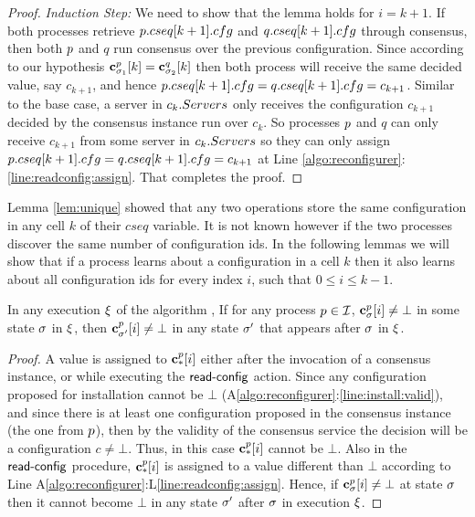 \begin{proof}
	\emph{Induction Step:}  We need to show that the lemma holds for $i=k+1$.
	If both processes retrieve $p.cseq[k+1].cfg$ and $q.cseq[k+1].cfg$ through consensus, 
	then both $p$ and $q$ run consensus
	over the previous configuration. Since according to our hypothesis 
	$\mathbf{c}^{p}_{\sigma_1}[k]=\mathbf{c}^{q}_{\sigma_2}[k]$ then both process will receive the same
	decided value, say $c_{k+1}$, and hence $p.cseq[k+1].cfg=q.cseq[k+1].cfg=c_{k+1}$. Similar to the base case,
	a server in $c_k.Servers$ only receives the configuration $c_{k+1}$ decided by the consensus instance run over $c_k$. 
	So processes 
	$p$ and $q$ can only receive $c_{k+1}$ from some server in $c_k.Servers$ 
	so they can only assign $p.cseq[k+1].cfg=q.cseq[k+1].cfg=c_{k+1}$ at Line \ref{algo:reconfigurer}:\ref{line:readconfig:assign}.
	That completes the proof. 
\end{proof}


Lemma \ref{lem:unique} showed that any two operations store the same
configuration in any cell $k$ of their $cseq$ variable. It is not known however 
if the two processes discover the same number of configuration ids. In the following
lemmas we will show that if a process learns about a configuration in a cell $k$ 
then it also learns about all configuration ids for every index $i$, such that $0\leq i\leq k-1$.

\begin{lemma}
\label{lem:confmonotonic}
	In any execution $\EX$ of the algorithm , If for any process $p\in\mathcal{I}$, $\mathbf{c}^{p}_{\sigma}[i]\neq\bot$ in some state $\sigma$ in $\EX$,
	then $\mathbf{c}^{p}_{\sigma'}[i]\neq\bot$ in any state $\sigma'$ that appears after $\sigma$ in $\EX$. 
\end{lemma}

\begin{proof}
	A value is assigned to $\mathbf{c}^{p}_{*}[i]$ either after the invocation of a consensus instance, or while executing
	the $\act{read-config}$ action. Since any configuration proposed for installation cannot be $\bot$ (A\ref{algo:reconfigurer}:\ref{line:install:valid}), 
	and since there is at least one configuration proposed in the consensus instance (the one from $p$), then by the validity of the consensus
	service the decision will be a configuration $c\neq\bot$. Thus, in this case $\mathbf{c}^{p}_{*}[i]$ cannot be $\bot$.
	Also in the $\act{read-config}$ procedure, $\mathbf{c}^{p}_{*}[i]$ is assigned to a value different than $\bot$ according
	to Line A\ref{algo:reconfigurer}:L\ref{line:readconfig:assign}. Hence, if $\mathbf{c}^{p}_{\sigma}[i]\neq\bot$ at state $\sigma$ 
	then it cannot become $\bot$ in any state $\sigma'$ after $\sigma$ in execution $\EX$.
\end{proof}


